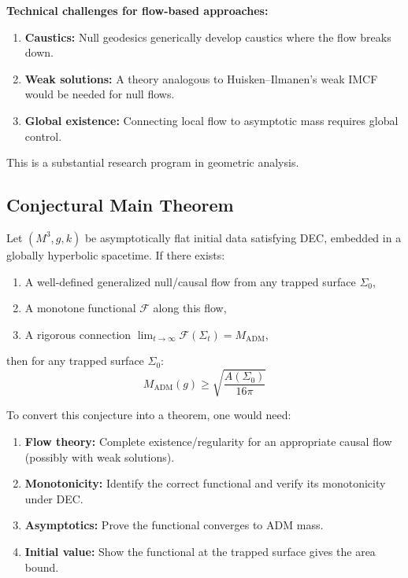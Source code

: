 \begin{remark}\label{rem:FlowGaps}
\textbf{Technical challenges for flow-based approaches:}
\begin{enumerate}
    \item \textbf{Caustics:} Null geodesics generically develop caustics where the flow breaks down.
    \item \textbf{Weak solutions:} A theory analogous to Huisken--Ilmanen's weak IMCF would be needed for null flows.
    \item \textbf{Global existence:} Connecting local flow to asymptotic mass requires global control.
\end{enumerate}
This is a substantial research program in geometric analysis.
\end{remark}

\subsection{Conjectural Main Theorem}

\begin{conjecture}\label{conj:CausalPenrose}
Let $(M^3, g, k)$ be asymptotically flat initial data satisfying DEC, embedded in a globally hyperbolic spacetime. If there exists:
\begin{enumerate}
    \item A well-defined generalized null/causal flow from any trapped surface $\Sigma_0$,
    \item A monotone functional $\mathcal{F}$ along this flow,
    \item A rigorous connection $\lim_{t\to\infty} \mathcal{F}(\Sigma_t) = M_{\mathrm{ADM}}$,
\end{enumerate}
then for any trapped surface $\Sigma_0$:
\begin{equation}
    M_{\mathrm{ADM}}(g) \geq \sqrt{\frac{A(\Sigma_0)}{16\pi}}
\end{equation}
\end{conjecture}

\begin{remark}
To convert this conjecture into a theorem, one would need:
\begin{enumerate}
    \item \textbf{Flow theory:} Complete existence/regularity for an appropriate causal flow (possibly with weak solutions).
    \item \textbf{Monotonicity:} Identify the correct functional and verify its monotonicity under DEC.
    \item \textbf{Asymptotics:} Prove the functional converges to ADM mass.
    \item \textbf{Initial value:} Show the functional at the trapped surface gives the area bound.
\end{enumerate}
\end{remark}

